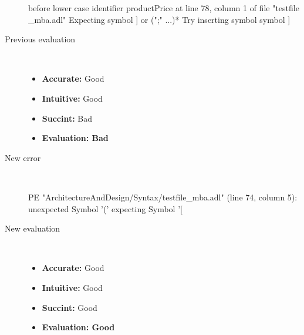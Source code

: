 \begin{description}
\begin{haskell}
before lower case identifier productPrice at line 78, column 1 of file "testfile
_mba.adl"
Expecting symbol ] or (";" ...)*
Try inserting symbol symbol ]
\end{haskell}
  \item[Previous evaluation]~\\
    \begin{itemize}
    \item \textbf{Accurate:} Good
    \item \textbf{Intuitive:} Good
    \item \textbf{Succint:} Bad
    \item \textbf{Evaluation: Bad}
    \end{itemize}
  \item[New error]~\\
\begin{haskell}
PE "ArchitectureAndDesign/Syntax/testfile_mba.adl" (line 74, column 5):
unexpected Symbol '('
expecting Symbol '[\end{haskell}
  \item[New evaluation]~\\
    \begin{itemize}
    \item \textbf{Accurate:} Good
    \item \textbf{Intuitive:} Good
    \item \textbf{Succint:} Good
    \item \textbf{Evaluation: Good
}
    \end{itemize}
  \end{description}

\hrulefill

